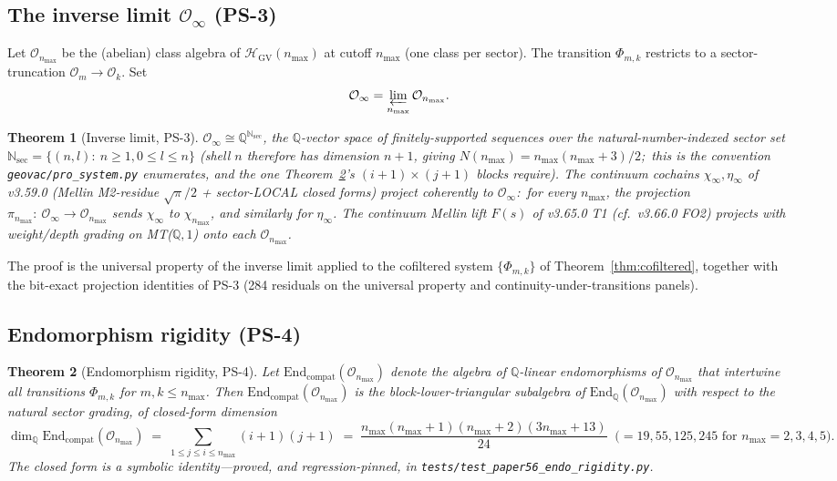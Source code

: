 \documentclass[11pt,a4paper]{article}
\theoremstyle{plain}
\newtheorem{theorem}{Theorem}[section]
\theoremstyle{definition}
\newcommand{\nmax}{n_{\max}}
\newcommand{\HGV}{\mathcal{H}_{\mathrm{GV}}}
\newcommand{\Oh}{\mathcal{O}}
\newcommand{\Ginf}{\mathcal{O}_{\infty}}
\newcommand{\End}{\mathrm{End}}
\newcommand{\Q}{\mathbb{Q}}
\newcommand{\N}{\mathbb{N}}
\begin{document}
\subsection{The inverse limit $\Ginf$ (PS-3)}\label{sec:inverse_limit}

Let $\Oh_{\nmax}$ be the (abelian) class algebra of $\HGV(\nmax)$ at
cutoff $\nmax$ (one class per sector). The transition $\Phi_{m, k}$
restricts to a sector-truncation $\Oh_{m} \to \Oh_{k}$. Set
\[
   \Ginf = \varprojlim_{\nmax} \Oh_{\nmax}.
\]

\begin{theorem}[Inverse limit, PS-3]\label{thm:inverse_limit}
$\Ginf \cong \Q^{\N_{\mathrm{sec}}}$, the $\Q$-vector space of
finitely-supported sequences over the natural-number-indexed sector
set $\N_{\mathrm{sec}} = \{(n, l) :\ n \ge 1, 0 \le l \le n\}$
(shell $n$ therefore has dimension $n + 1$, giving $N(\nmax) = \nmax(\nmax + 3)/2$;\
this is the convention \texttt{geovac/pro\_system.py} enumerates, and the one
Theorem~\ref{thm:endo_rigidity}'s $(i+1) \times (j+1)$ blocks require). The
continuum cochains $\chi_{\infty}, \eta_{\infty}$ of v3.59.0 (Mellin
M2-residue $\sqrt{\pi}/2$ + sector-LOCAL closed forms) project
coherently to $\Ginf$:\ for every $\nmax$, the projection
$\pi_{\nmax} :\ \Ginf \to \Oh_{\nmax}$ sends $\chi_{\infty}$ to
$\chi_{\nmax}$, and similarly for $\eta_{\infty}$. The continuum
Mellin lift $F(s)$ of v3.65.0 T1 (cf.\ v3.66.0 FO2) projects with
weight/depth grading on MT($\Q, 1$) onto each $\Oh_{\nmax}$.
\end{theorem}

The proof is the universal property of the inverse limit applied to
the cofiltered system $\{\Phi_{m, k}\}$ of Theorem~\ref{thm:cofiltered},
together with the bit-exact projection identities of PS-3 (284
residuals on the universal property and continuity-under-transitions
panels).

\subsection{Endomorphism rigidity (PS-4)}\label{sec:endo_rigidity}

\begin{theorem}[Endomorphism rigidity, PS-4]\label{thm:endo_rigidity}
Let $\End_{\mathrm{compat}}(\Oh_{\nmax})$ denote the algebra of
$\Q$-linear endomorphisms of $\Oh_{\nmax}$ that intertwine all
transitions $\Phi_{m, k}$ for $m, k \le \nmax$. Then
$\End_{\mathrm{compat}}(\Oh_{\nmax})$ is the block-lower-triangular
subalgebra of $\End_{\Q}(\Oh_{\nmax})$ with respect to the natural
sector grading, of closed-form dimension
\[
   \dim_{\Q} \End_{\mathrm{compat}}(\Oh_{\nmax})
   \;=\; \sum_{1 \le j \le i \le \nmax} (i + 1)(j + 1)
   \;=\; \frac{\nmax(\nmax + 1)(\nmax + 2)(3 \nmax + 13)}{24}
   \;\;\bigl(= 19, 55, 125, 245 \text{ for } \nmax = 2, 3, 4, 5\bigr).
\]
The closed form is a symbolic identity---proved, and regression-pinned, in
\texttt{tests/test\_paper56\_endo\_rigidity.py}.
\end{theorem}
\end{document}
